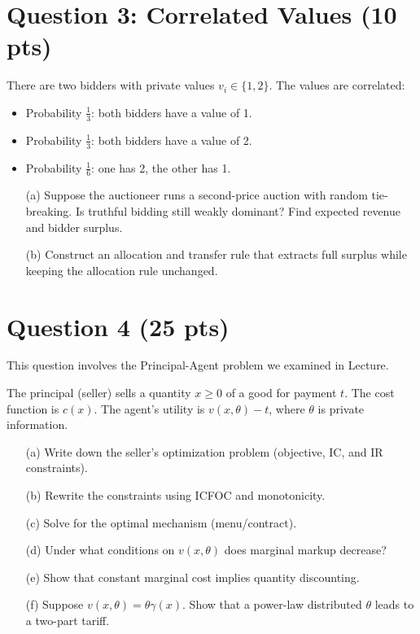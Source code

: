 \documentclass[10pt,a4paper]{article}
\begin{document}
\section*{Question 3: Correlated Values (10 pts)}
  There are two bidders with private values $v_i \in \{1,2\}$. The values are correlated:
  \begin{itemize}
      \item Probability $\frac{1}{3}$: both bidders have a value of 1.
      \item Probability $\frac{1}{3}$: both bidders have a value of 2.
      \item Probability $\frac{1}{6}$: one has 2, the other has 1.
  \end{itemize}
  \begin{enumerate}
      \item[(a)] Suppose the auctioneer runs a second-price auction with random tie-breaking. Is truthful bidding still weakly dominant? Find expected revenue and bidder surplus.
      \item[(b)] Construct an allocation and transfer rule that extracts full surplus while keeping the allocation rule unchanged.
  \end{enumerate}

\section*{Question 4 (25 pts)}
  This question involves the Principal-Agent problem we examined in Lecture.

  The principal (seller) sells a quantity $x \geq 0$ of a good for payment $t$. The cost function is $c(x)$. The agent’s utility is $v(x, \theta) - t$, where $\theta$ is private information.
  \begin{enumerate}
      \item[(a)] Write down the seller’s optimization problem (objective, IC, and IR constraints).
      \item[(b)] Rewrite the constraints using ICFOC and monotonicity.
      \item[(c)] Solve for the optimal mechanism (menu/contract).
      \item[(d)] Under what conditions on $v(x,\theta)$ does marginal markup decrease?
      \item[(e)] Show that constant marginal cost implies quantity discounting.
      \item[(f)] Suppose $v(x, \theta) = \theta \gamma(x)$. Show that a power-law distributed $\theta$ leads to a two-part tariff.
  \end{enumerate}
\end{document}
